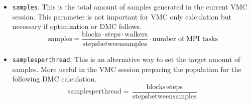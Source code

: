 \begin{itemize}
\item \texttt{samples}. This is the total amount of samples generated in the current VMC session. This parameter is not important for VMC only calculation but necessary if optimization or DMC follows.
\[
\textrm{samples}=
\frac{\textrm{blocks}\cdot\textrm{steps}\cdot\textrm{walkers}}{\textrm{stepsbetweensamples}}\cdot\textrm{number of MPI tasks}
\]

\item \texttt{samplesperthread}. This is an alternative way to set the target amount of samples. More useful in the VMC session preparing the population for the following DMC calculation.
\[
\textrm{samplesperthread}=
\frac{\textrm{blocks}\cdot\textrm{steps}}{\textrm{stepsbetweensamples}}
\]

\end{itemize}

